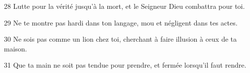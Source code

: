
28 Lutte pour la vérité jusqu’à la mort, et le Seigneur Dieu combattra pour toi.

29 Ne te montre pas hardi dans ton langage, mou et négligent dans tes actes.

30 Ne sois pas comme un lion chez toi, cherchant à faire illusion à ceux de ta maison.

31 Que ta main ne soit pas tendue pour prendre, et fermée lorsqu’il faut rendre.